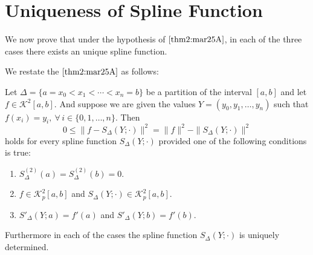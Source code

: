 
\section{Uniqueness of Spline Function}

We now prove that under the hypothesis of  $\ref{thm2:mar25A}$, in each of the three cases there exists an unique spline function.

We restate the  $\ref{thm2:mar25A}$ as follows: 

\begin{thm}\label{thm1:mar25B}
    Let $ \Delta = \{ a = x_0 < x_1 < \cdots < x_n = b \} $
    be a partition of the interval $[a,b]$ and let $f \in \mathcal{K}^2[a,b]$. And suppose we are given the values $Y = (y_0, y_1, \dots, y_n)$ such that $f(x_i) = y_i, \ \forall \, i \in \{0,1,\dots,n\}$. Then
    \[
        0 \leq \| f - S_{\Delta}(Y; \cdot) \|^2 = \|f\|^2 - \| S_{\Delta}(Y; \cdot) \|^2    
    \]
    holds for every spline function $S_{\Delta}(Y; \cdot)$ provided one of the following conditions is true:
    \begin{enumerate}[label = (\alph*)]
        \item $S_{\Delta}^{(2)}(a) = S_{\Delta}^{(2)}(b) = 0 $. 
        
        \item $f \in \mathcal{K}_p^2[a,b]$ and $S_{\Delta}(Y; \cdot) \in \mathcal{K}^2_p[a,b]$.
        
        \item $S'_{\Delta}(Y;a) = f'(a)$ and $S'_{\Delta}(Y;b) = f'(b)$. 
    \end{enumerate}

    \vspace{0.1cm} 

    Furthermore in each of the cases the spline function $S_{\Delta}(Y; \cdot)$ is uniquely determined.
\end{thm}

